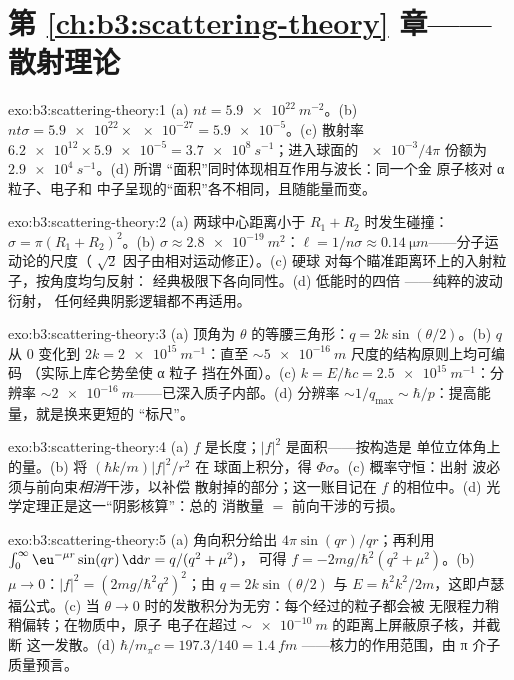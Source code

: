 \section*{第 \ref{ch:b3:scattering-theory} 章——散射理论}

\begin{solution}{exo:b3:scattering-theory:1}
(a) $nt = \qty{5.9e22}{m^{-2}}$。(b) $nt\sigma = \num{5.9e22}
\times \num{e-27} = \num{5.9e-5}$。(c) 散射率
$\num{6.2e12} \times \num{5.9e-5} = \qty{3.7e8}{s^{-1}}$；进入球面的
$\num{e-3}/4\pi$ 份额为 $\qty{2.9e4}{s^{-1}}$。(d) 所谓
“面积”同时体现相互作用与波长：同一个金
原子核对 α 粒子、电子和
中子呈现的“面积”各不相同，且随能量而变。
\end{solution}

\begin{solution}{exo:b3:scattering-theory:2}
(a) 两球中心距离小于 $R_1 + R_2$ 时发生碰撞：$\sigma = \pi(R_1 +
R_2)^2$。(b) $\sigma \approx \qty{2.8e-19}{m^2}$：$\ell = 1/n\sigma
\approx \qty{0.14}{\micro m}$——分子运动论的尺度（
$\sqrt2$ 因子由相对运动修正）。(c) 硬球
对每个瞄准距离环上的入射粒子，按角度均匀反射：
经典极限下各向同性。(d) 低能时的四倍
——纯粹的波动衍射，
任何经典阴影逻辑都不再适用。
\end{solution}

\begin{solution}{exo:b3:scattering-theory:3}
(a) 顶角为 $\theta$ 的等腰三角形：$q =
2k\sin(\theta/2)$。(b) $q$ 从 $0$ 变化到 $2k = \qty{2e15}{
m^{-1}}$：直至 $\sim\qty{5e-16}{m}$ 尺度的结构原则上均可编码
（实际上库仑势垒使 α 粒子
挡在外面）。(c) $k = E/\hbar c = \qty{2.5e15}{m^{-1}}$：分辨率
$\sim\qty{2e-16}{m}$——已深入质子内部。(d) 分辨率
$\sim 1/q_{\max} \sim \hbar/p$：提高能量，就是换来更短的
“标尺”。
\end{solution}

\begin{solution}{exo:b3:scattering-theory:4}
(a) $f$ 是长度；$|f|^2$ 是面积——按构造是
单位立体角上的量。(b) 将 $(\hbar k/m)|f|^2/r^2$ 在
球面上积分，得 $\Phi\sigma$。(c) 概率守恒：出射
波必须与前向束\emph{相消}干涉，以补偿
散射掉的部分；这一账目记在 $f$ 的相位中。(d)
光学定理正是这一“阴影核算”：总的
消散量 $=$ 前向干涉的亏损。
\end{solution}

\begin{solution}{exo:b3:scattering-theory:5}
(a) 角向积分给出 $4\pi\sin(qr)/qr$；再利用
$\int_0^\infty\eu^{-\mu r}\sin(qr)\,\dd r = q/(q^2 + \mu^2)$，
可得 $f = -2mg/\hbar^2(q^2 + \mu^2)$。(b) $\mu \to 0$：$|f|^2 =
(2mg/\hbar^2q^2)^2$；由 $q = 2k\sin(\theta/2)$ 与 $E =
\hbar^2k^2/2m$，这即卢瑟福公式。(c) 当 $\theta \to
0$ 时的发散积分为无穷：每个经过的粒子都会被
无限程力稍稍偏转；在物质中，原子
电子在超过 $\sim\qty{e-10}{m}$ 的距离上屏蔽原子核，并截断
这一发散。(d) $\hbar/m_\pi c = 197.3/140 = \qty{1.4}{fm}$
——核力的作用范围，由 π 介子质量预言。
\end{solution}

